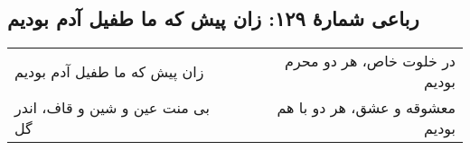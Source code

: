 \begin{center}
\section*{رباعی شمارهٔ ۱۲۹: زان پیش که ما طفیل آدم بودیم}
\label{sec:129}
\begin{longtable}{l p{0.5cm} r}
زان پیش که ما طفیل آدم بودیم
&&
در خلوت خاص، هر دو محرم بودیم
\\
بی منت عین و شین و قاف، اندر گل
&&
معشوقه و عشق، هر دو با هم بودیم
\\
\end{longtable}
\end{center}
